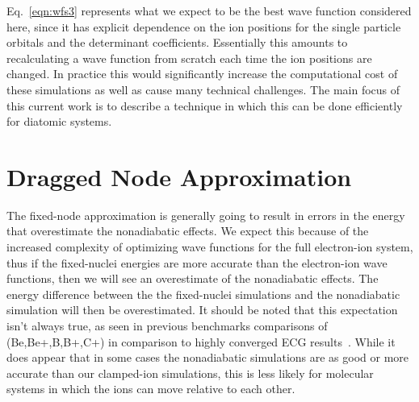 \documentclass[aip,jcp,numerical,reprint]{revtex4-1}
\begin{document}
Eq.~\eqref{eqn:wfs3} represents what we expect to be the best wave function considered here, since it has explicit dependence on the ion positions for the single particle orbitals and the determinant coefficients. Essentially this amounts to recalculating a wave function from scratch each time the ion positions are changed.  In practice this would significantly increase the computational cost of these simulations as well as cause many technical challenges.  The main focus of this current work is to describe a technique in which this can be done efficiently for diatomic systems. 


\section{Dragged Node Approximation}


The fixed-node approximation is generally going to result in errors in the energy that overestimate the nonadiabatic effects.   We expect this because of the increased complexity of optimizing wave functions for the full electron-ion system, thus if the fixed-nuclei energies are more accurate than the electron-ion wave functions, then we will see an overestimate of the nonadiabatic effects.   The energy difference between the the fixed-nuclei simulations and the nonadiabatic simulation will then be overestimated.  It should be noted that this expectation isn't always true, as seen in previous benchmarks comparisons of (Be,Be+,B,B+,C+) in comparison to highly converged ECG results~\cite{Yang2015}.  While it does appear that in some cases the nonadiabatic simulations are as good or more accurate than our clamped-ion simulations, this is less likely for molecular systems in which the ions can move relative to each other.    %
\end{document}
